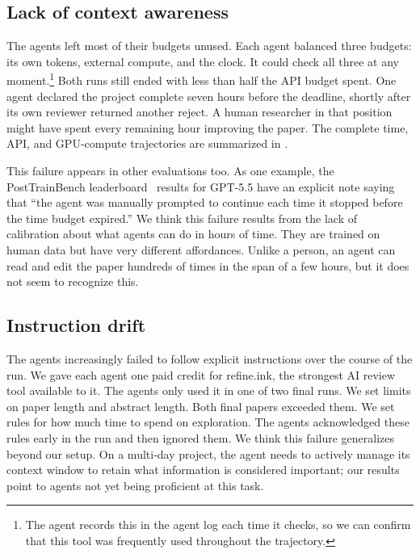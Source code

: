 \subsection{Lack of context awareness}

The agents left most of their budgets unused. Each agent balanced three
budgets: its own tokens, external compute, and the clock. It could check all
three at any moment.\footnote{The agent records this in the agent log each time
it checks, so we can confirm that this tool was frequently used throughout the
trajectory.} Both runs still ended with less than half the API budget spent.
One agent declared the project complete seven hours before the deadline,
shortly after its own reviewer returned another reject. A human researcher in
that position might have spent every remaining hour improving the paper.
The complete time, API, and GPU-compute trajectories are summarized in
.


This failure appears in other evaluations too. As one example, the
PostTrainBench leaderboard~\citep{posttrainbenchleaderboard} results for GPT-5.5 have an explicit note saying
that ``the agent was manually prompted to continue each time it stopped before
the time budget expired.'' We think this failure results from the lack of
calibration about what agents can do in hours of time. They are trained on
human data but have very different affordances. Unlike a person, an agent can
read and edit the paper hundreds of times in the span of a few hours, but it
does not seem to recognize this.


\subsection{Instruction drift}

The agents increasingly failed to follow explicit instructions over the course of the run. We gave each agent one paid credit for refine.ink, the strongest AI review tool available to it. The agents only used it in one of two final runs. We set
limits on paper length and abstract length. Both final papers exceeded them.
We set rules for how much time to spend on exploration. The agents acknowledged
these rules early in the run and then ignored them. We think this failure
generalizes beyond our setup. On a multi-day project, the agent needs to
actively manage its context window to retain what information is considered
important; our results point to agents not yet being proficient at this task.

